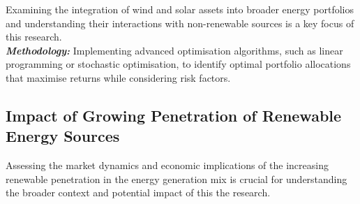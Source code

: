     Examining the integration of wind and solar assets into broader energy portfolios and understanding
    their interactions with non-renewable sources is a key focus of this research.\\

    \textbf{\textit{Methodology: }} Implementing advanced optimisation algorithms, such as linear programming or
    stochastic optimisation, to identify optimal portfolio allocations that maximise returns
    while considering risk factors.

\subsection{Impact of Growing Penetration of Renewable Energy Sources}
    \label{subsec:rs_impact-of-growing-penetration-of-renewable-energy-sources}

    Assessing the market dynamics and economic implications of the increasing renewable penetration in the
    energy generation mix is crucial for understanding the broader context and potential impact of this the research.

%
%

